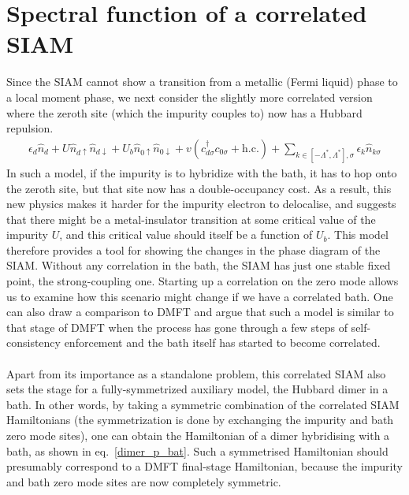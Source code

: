 \documentclass{article}
\numberwithin{equation}{section}
\begin{document}
\section{Spectral function of a correlated SIAM}
Since the SIAM cannot show a transition from a metallic (Fermi liquid) phase to a local moment phase, we next consider the slightly more correlated version where the zeroth site (which the impurity couples to) now has a Hubbard repulsion.
\begin{equation}\begin{aligned}
	\epsilon_d \hat n_d + U\hat n_{d \uparrow} \hat n_{d \downarrow} + U_b\hat n_{0 \uparrow} \hat n_{0 \downarrow} + v \left(c^\dagger_{d\sigma}c_{0\sigma} + \text{h.c.}\right) + \sum_{k \in \left[-\Lambda^*, \Lambda^*\right], \sigma}\epsilon_k \hat n_{k\sigma}
\end{aligned}\end{equation}
In such a model, if the impurity is to hybridize with the bath, it has to hop onto the zeroth site, but that site now has a double-occupancy cost. As a result, this new physics makes it harder for the impurity electron to delocalise, and suggests that there might be a metal-insulator transition at some critical value of the impurity \(U\), and this critical value should itself be a function of \(U_b\). This model therefore provides a tool for showing the changes in the phase diagram of the SIAM. Without any correlation in the bath, the SIAM has just one stable fixed point, the strong-coupling one. Starting up a correlation on the zero mode allows us to examine how this scenario might change if we have a correlated bath. One can also draw a comparison to DMFT and argue that such a model is similar to that stage of DMFT when the process has gone through a few steps of self-consistency enforcement and the bath itself has started to become correlated.
\\\\
Apart from its importance as a standalone problem, this correlated SIAM also sets the stage for a fully-symmetrized auxiliary model, the Hubbard dimer in a bath. In other words, by taking a symmetric combination of the correlated SIAM Hamiltonians (the symmetrization is done by exchanging the impurity and bath zero mode sites), one can obtain the Hamiltonian of a dimer hybridising with a bath, as shown in eq.~\ref{dimer_p_bat}. Such a symmetrised Hamiltonian should presumably correspond to a DMFT final-stage Hamiltonian, because the impurity and bath zero mode sites are now completely symmetric.
\end{document}

